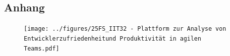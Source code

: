 \documentclass[12pt,a4paper]{report}
\begin{document}
\begin{appendices}
    \section{Anhang}

    \begin{figure}[H]
    \centering
    \texttt{[image: ../figures/25FS\_IIT32 - Plattform zur Analyse von Entwicklerzufriedenheitund Produktivität in agilen Teams.pdf]}
    \end{figure}
\end{appendices}
\end{document}
